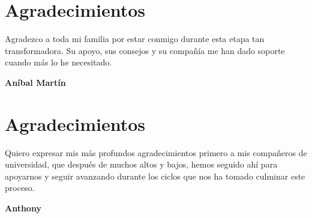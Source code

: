 \chapter*{Agradecimientos}

Agradezco a toda mi familia por estar conmigo durante esta etapa tan transformadora. Su apoyo, sus consejos y su compañía me han dado soporte cuando más lo he necesitado.


\vspace{0.5cm} 

\hfill{\textbf{Aníbal Martín}}

\newpage

\chapter*{Agradecimientos}

Quiero expresar mis más profundos agradecimientos primero a mis compañeros de universidad, que después de muchos altos y bajos, hemos seguido ahí para apoyarnos y seguir avanzando durante los ciclos que nos ha tomado culminar este proceso.\\

\vspace{0.5cm} 

\hfill{\textbf{Anthony}}
